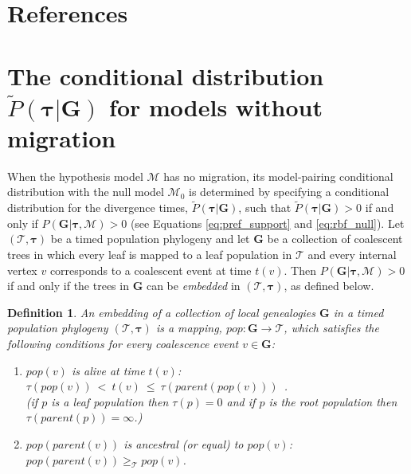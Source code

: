 \documentclass[11pt]{article}
\newcommand{\vect}[1]{\boldsymbol{\mathbf{#1}}}
\newcommand{\M}{\mathcal{M}}
\newcommand{\Tr}{\mathcal{T}}
\newcommand{\G}{\vect{G}}
\newcommand{\Pref}{\widetilde{P}}
\newcommand{\1}{\mathbbm{1}}
\newtheorem{definition}{Definition}
\newcommand{\taus}{\vect\tau}
\begin{document}
\newpage

\newpage

\section{References}
\renewcommand*{\refname}{ }





\newpage


\appendix
\newcommand{\anc}{\geq_\Tr}
\newcommand{\nanc}{\ngeq_\Tr}

\section{\texorpdfstring{The conditional distribution $\Pref(\taus|\G)$ for models without migration}{Conditional distribution without migration}}\label{ap:cond_nomig}

When the hypothesis model $\M$ has no migration, its model-pairing conditional distribution with the null model $\M_0$ is determined by specifying a conditional
distribution for the divergence times, $\Pref(\taus|\G)$, such that $\Pref(\taus|\G)>0$ if and only if $P(\G|\taus,\M)>0$
(see Equations \ref{eq:pref_support} and \ref{eq:rbf_null}).
%
Let $(\Tr,\taus)$ be a timed population phylogeny and let $\G$ be a collection of coalescent trees in which every leaf is mapped to a leaf population in $\Tr$
and  every internal vertex $v$ corresponds to a coalescent event at time $t(v)$.
Then $P(\G|\taus,\M)>0$ if and only if the trees in $\G$ can be \emph{embedded} in  $(\Tr,\taus)$, as defined below.
%
\begin{definition}\label{def:embed}
 An embedding of a collection of local genealogies $\G$ in a timed population phylogeny $(\Tr,\taus)$ is a mapping, $pop:\G\rightarrow\Tr$,
 which satisfies the following conditions for every coalescence event $v\in\G$:
 \begin{enumerate}
  \item $pop(v)$ is alive at time $t(v)$:~~ $\tau(pop(v)) ~<~ t(v) ~\leq~ \tau(parent(pop(v)))$~.\label{cond:time}\\
  (if $p$ is a leaf population then $\tau(p)=0$ and if $p$ is the root population then $\tau(parent(p))=\infty$.)
  \item $pop(parent(v))$ is ancestral (or equal) to $pop(v)$:~~ $pop(parent(v)) \anc pop(v)$.\label{cond:anc}
 \end{enumerate}
\end{definition}
\end{document}
